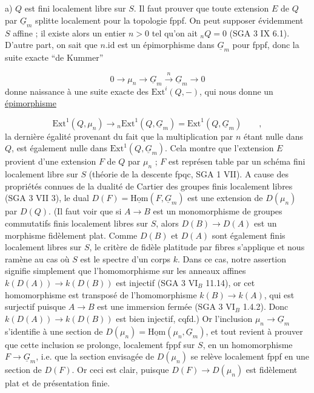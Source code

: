 a) $Q$ est fini localement libre sur $S$. Il faut prouver que toute extension $E$ de $Q$ par $\underline{G}_m$ splitte localement pour la topologie fppf. On peut supposer évidemment $S$ affine ; il existe alors un entier $n > 0$ tel qu'on ait ${}_nQ = 0$ (SGA 3 IX 6.1). D'autre part, on sait que $n.\mathrm{id}$ est un épimorphisme dans $\underline{G}_m$ pour fppf, donc la suite exacte ``de Kummer''

\begin{equation*}
0 \longrightarrow \mu_n \longrightarrow \underline{G}_m \xrightarrow{\ n\ } \underline{G}_m \longrightarrow 0
\end{equation*}
donne naissance à une suite exacte des $\mathrm{Ext}^i(Q, - )$, qui nous donne un \underline{épimorphisme}

\begin{equation*}
\mathrm{Ext}^1(Q,\mu_n) \longrightarrow {}_n\mathrm{Ext}^1(Q,\underline{G}_m) = \mathrm{Ext}^1(Q,\underline{G}_m) \qquad ,
\end{equation*}
la dernière égalité provenant du fait que la multiplication par $n$ étant nulle dans $Q$, est également nulle dans $\mathrm{Ext}^1(Q,\underline{G}_m)$. Cela montre que l'extension $E$ provient d'une extension $F$ de $Q$ par $\mu_n$ ; $F$ est représen
table par un schéma fini localement libre sur $S$ (théorie de la descente fpqc, SGA 1 VII). A cause des propriétés connues de la dualité de Cartier des groupes finis localement libres (SGA 3 VII 3), le dual $D(F) = \underline{\mathrm{Hom}}(F,\underline{G}_m)$ est une extension de $D(\mu_n)$ par $D(Q)$. (Il faut voir que si $A \longrightarrow B$ est un monomorphisme de groupes commutatifs finis localement libres sur $S$, alors $D(B) \longrightarrow D(A)$ est un morphisme fidèlement plat. Comme $D(B)$ et $D(A)$ sont également finis localement libres sur $S$, le critère de fidèle platitude par fibres s'applique et nous ramène au cas où $S$ est le spectre d'un corps $k$. Dans ce cas, notre assertion signifie simplement que l'homomorphisme sur les anneaux affines $k(D(A)) \longrightarrow k(D(B))$ est injectif (SGA 3 $\mathrm{VI}_B$ 11.14), or cet homomorphisme est transposé de l'homomorphisme $k(B) \longrightarrow k(A)$, qui est surjectif puisque $A \longrightarrow B$ est une immersion fermée (SGA 3 $\mathrm{VI}_B$ 1.4.2). Donc $k(D(A)) \longrightarrow k(D(B))$ est bien injectif, cqfd.) Or l'inclusion $\mu_n \to \underline{G}_m$ s'identifie à une section de $D(\mu_n) = \underline{\mathrm{Hom}}(\mu_n,\underline{G}_m)$, et tout revient à prouver que cette inclusion se prolonge, localement fppf sur $S$, en un homomorphisme $F \longrightarrow \underline{G}_m$, i.e. que la section envisagée de $D(\mu_n)$ se relève localement fppf en une section de $D(F)$. Or ceci est clair, puisque $D(F) \longrightarrow D(\mu_n)$ est fidèlement plat et de présentation finie.

